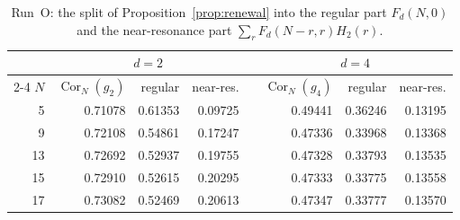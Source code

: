 \documentclass[12pt]{amsart}
\theoremstyle{definition}
\theoremstyle{remark}
\begin{document}
\begin{table}[tp]
\centering
\small
\begin{tabular}{@{}rrrrrrrr@{}}
\toprule
 & \multicolumn{3}{c}{$d=2$} & & \multicolumn{3}{c}{$d=4$}\\
\cmidrule{2-4}\cmidrule{6-8}
$N$ & $\operatorname{Cor}_N(g_2)$ & regular & near-res. & & $\operatorname{Cor}_N(g_4)$ & regular & near-res.\\
\midrule
5 & 0.71078 & 0.61353 & 0.09725 & & 0.49441 & 0.36246 & 0.13195\\
9 & 0.72108 & 0.54861 & 0.17247 & & 0.47336 & 0.33968 & 0.13368\\
13 & 0.72692 & 0.52937 & 0.19755 & & 0.47328 & 0.33793 & 0.13535\\
15 & 0.72910 & 0.52615 & 0.20295 & & 0.47333 & 0.33775 & 0.13558\\
17 & 0.73082 & 0.52469 & 0.20613 & & 0.47347 & 0.33777 & 0.13570\\
\bottomrule
\end{tabular}
\caption{Run~O: the split of Proposition~\ref{prop:renewal} into the regular part $F_d(N,0)$ and the near-resonance part $\sum_rF_d(N-r,r)H_2(r)$.}
\label{table:syr-runO}
\end{table}

\FloatBarrier

\newpage


\end{document}
